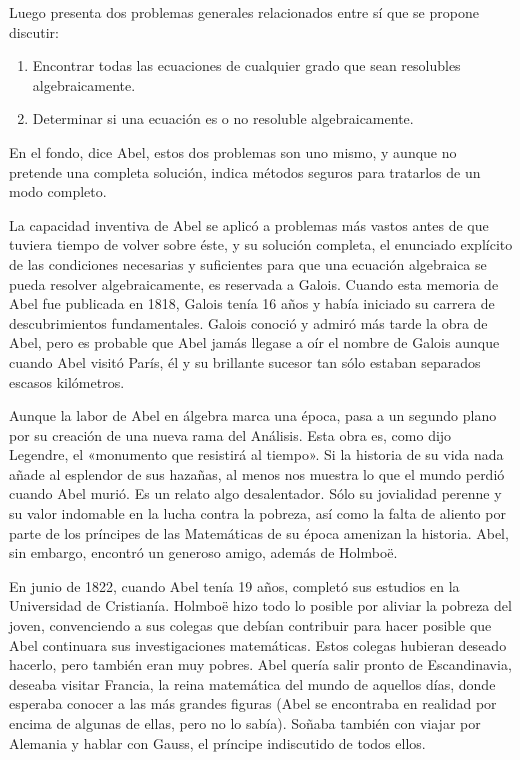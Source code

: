 \documentclass[a4paper, 12pt, draft]{article}
\begin{document}
Luego presenta dos problemas generales relacionados entre sí que se propone discutir:

\begin{enumerate}

   \item  Encontrar todas las ecuaciones de cualquier grado que sean resolubles algebraicamente.
   
   \item Determinar si una ecuación es o no resoluble algebraicamente.

\end{enumerate}

En el fondo, dice Abel, estos dos problemas son uno mismo, y aunque no pretende una completa solución, indica métodos seguros  para tratarlos de un modo completo.

La capacidad inventiva de Abel se aplicó a problemas más vastos antes de que tuviera tiempo de volver sobre éste, y su solución completa, el enunciado explícito de las condiciones necesarias y suficientes para que una ecuación algebraica se pueda resolver algebraicamente, es reservada a Galois. Cuando esta memoria de Abel fue publicada en 1818, Galois tenía 16 años y había iniciado su carrera de descubrimientos fundamentales. Galois conoció y admiró más tarde la obra de Abel, pero es probable que Abel jamás llegase a oír el nombre de Galois aunque cuando Abel visitó París, él y su brillante sucesor tan sólo estaban separados escasos kilómetros.

Aunque la labor de Abel en álgebra marca una época, pasa a un segundo plano por su creación de una nueva rama del Análisis. Esta obra es, como dijo Legendre, el «monumento que resistirá al tiempo». Si la historia de su vida nada añade al esplendor de sus hazañas, al menos nos muestra lo que el mundo perdió cuando Abel murió. Es un relato algo desalentador. Sólo su jovialidad perenne y su valor indomable en la lucha contra la pobreza, así como la falta de aliento por parte de los príncipes de las Matemáticas de su época amenizan la historia. Abel, sin embargo, encontró un generoso amigo, además de Holmboë.

En junio de 1822, cuando Abel tenía 19 años, completó sus estudios en la Universidad de Cristianía. Holmboë hizo todo lo posible por aliviar la pobreza del joven, convenciendo a sus colegas que debían contribuir para hacer posible que Abel continuara sus investigaciones matemáticas. Estos colegas hubieran deseado hacerlo, pero también eran muy pobres. Abel quería salir pronto de Escandinavia, deseaba visitar Francia, la reina matemática del mundo de aquellos días, donde esperaba conocer a las más grandes figuras (Abel se encontraba en realidad por encima de algunas de ellas, pero no lo sabía). Soñaba también con viajar por Alemania y hablar con Gauss, el príncipe indiscutido de todos ellos.
\end{document}
